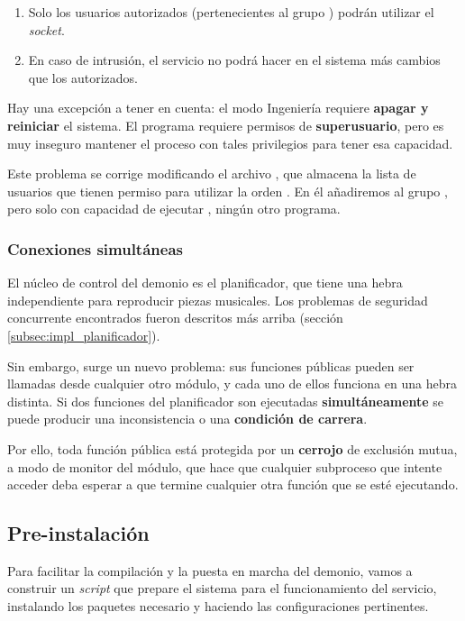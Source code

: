 \begin{enumerate}
	\item Solo los usuarios autorizados (pertenecientes al grupo ) podrán utilizar el \textit{socket}.
	
	\item En caso de intrusión, el servicio no podrá hacer en el sistema más cambios que los autorizados.
\end{enumerate}

Hay una excepción a tener en cuenta: el modo Ingeniería requiere\textbf{ apagar y reiniciar} el sistema. El programa  requiere permisos de \textbf{superusuario}, pero es muy inseguro mantener el proceso con tales privilegios para tener esa capacidad.

Este problema se corrige modificando el archivo , que almacena la lista de usuarios que tienen permiso para utilizar la orden . En él añadiremos al grupo , pero solo con capacidad de ejecutar , ningún otro programa.

\subsubsection{Conexiones simultáneas}

El núcleo de control del demonio es el planificador, que tiene una hebra independiente para reproducir piezas musicales. Los problemas de seguridad concurrente encontrados fueron descritos más arriba (sección \ref{subsec:impl_planificador}).

Sin embargo, surge un nuevo problema: sus funciones públicas pueden ser llamadas desde cualquier otro módulo, y cada uno de ellos funciona en una hebra distinta. Si dos funciones del planificador son ejecutadas \textbf{simultáneamente} se puede producir una inconsistencia o una \textbf{condición de carrera}.

Por ello, toda función pública está protegida por un \textbf{cerrojo} de exclusión mutua, a modo de monitor del módulo, que hace que cualquier subproceso que intente acceder deba esperar a que termine cualquier otra función que se esté ejecutando.

\subsection{Pre-instalación}

Para facilitar la compilación y la puesta en marcha del demonio, vamos a construir un \textit{script} que prepare el sistema para el funcionamiento del servicio, instalando los paquetes necesario y haciendo las configuraciones pertinentes.

